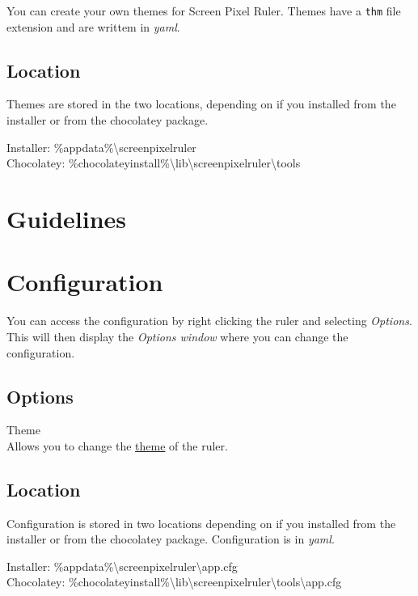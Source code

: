 \documentclass[
]{book}
\begin{document}
You can create your own themes for Screen Pixel Ruler.
Themes have a \texttt{thm} file extension and are writtem in \emph{yaml}.

\hypertarget{location}{%
\section{Location}\label{location}}

Themes are stored in the two locations, depending on if you installed from the installer or from the chocolatey package.

Installer: \%appdata\%\textbackslash screenpixelruler\\
Chocolatey: \%chocolateyinstall\%\textbackslash lib\textbackslash screenpixelruler\textbackslash tools

\hypertarget{guidelines}{%
\chapter{Guidelines}\label{guidelines}}

\hypertarget{config}{%
\chapter{Configuration}\label{config}}

You can access the configuration by right clicking the ruler and selecting \emph{Options}.
This will then display the \emph{Options window} where you can change the configuration.

\hypertarget{options}{%
\section{Options}\label{options}}

Theme\\
Allows you to change the \protect\hyperlink{themes}{theme} of the ruler.

\hypertarget{location-1}{%
\section{Location}\label{location-1}}

Configuration is stored in two locations depending on if you installed from the installer or from the chocolatey package.
Configuration is in \emph{yaml}.

Installer: \%appdata\%\textbackslash screenpixelruler\textbackslash app.cfg\\
Chocolatey: \%chocolateyinstall\%\textbackslash lib\textbackslash screenpixelruler\textbackslash tools\textbackslash app.cfg
\end{document}
